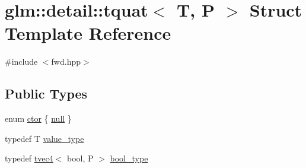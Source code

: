 \hypertarget{structglm_1_1detail_1_1tquat}{}\section{glm\+:\+:detail\+:\+:tquat$<$ T, P $>$ Struct Template Reference}
\label{structglm_1_1detail_1_1tquat}


{\ttfamily \#include $<$fwd.\+hpp$>$}

\subsection*{Public Types}
\begin{DoxyCompactItemize}
\item 
enum \hyperlink{structglm_1_1detail_1_1tquat_a61a530a53df553ec85f45e6b5ce6d7c3}{ctor} \{ \hyperlink{structglm_1_1detail_1_1tquat_a61a530a53df553ec85f45e6b5ce6d7c3a8dde10de7e48095da9f3e497c958227c}{null}
 \}
\item 
typedef T \hyperlink{structglm_1_1detail_1_1tquat_af313f5388bc71d19ec712f20fe24cc9b}{value\+\_\+type}
\item 
typedef \hyperlink{structglm_1_1detail_1_1tvec4}{tvec4}$<$ bool, P $>$ \hyperlink{structglm_1_1detail_1_1tquat_a22ca5a5296466eb23f4f499ffecc8d46}{bool\+\_\+type}
\end{DoxyCompactItemize}
